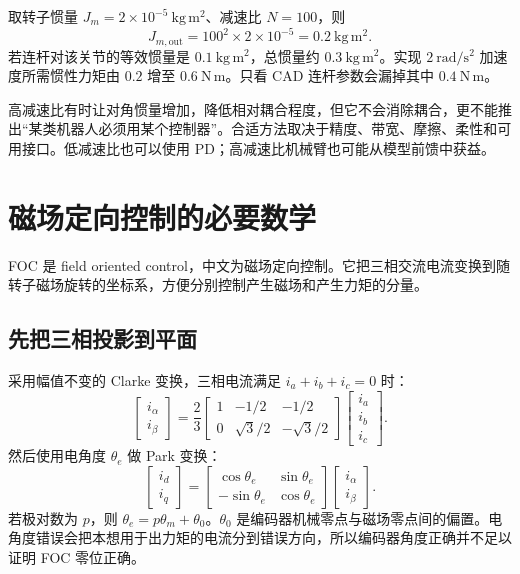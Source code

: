 \begin{examplebox}[算例 7B 一个很小的转子可以有明显的输出端惯量]
取转子惯量 $J_m=2\times10^{-5}\ \mathrm{kg\,m^2}$、减速比 $N=100$，则
\[
 J_{m,\mathrm{out}}=100^2\times2\times10^{-5}=0.2\ \mathrm{kg\,m^2}.
\]
若连杆对该关节的等效惯量是 $0.1\ \mathrm{kg\,m^2}$，总惯量约 $0.3\ \mathrm{kg\,m^2}$。实现 $2\ \mathrm{rad/s^2}$ 加速度所需惯性力矩由 $0.2$ 增至 $0.6\ \mathrm{N\,m}$。只看 CAD 连杆参数会漏掉其中 $0.4\ \mathrm{N\,m}$。
\end{examplebox}

高减速比有时让对角惯量增加，降低相对耦合程度，但它不会消除耦合，更不能推出“某类机器人必须用某个控制器”。合适方法取决于精度、带宽、摩擦、柔性和可用接口。低减速比也可以使用 PD；高减速比机械臂也可能从模型前馈中获益。

\section{磁场定向控制的必要数学}
FOC 是 field oriented control，中文为磁场定向控制。它把三相交流电流变换到随转子磁场旋转的坐标系，方便分别控制产生磁场和产生力矩的分量。

\subsection{先把三相投影到平面}
采用幅值不变的 Clarke 变换，三相电流满足 $i_a+i_b+i_c=0$ 时：
\begin{equation}
 \begin{bmatrix}i_\alpha\\i_\beta\end{bmatrix}
 =\frac23\begin{bmatrix}1&-1/2&-1/2\\0&\sqrt3/2&-\sqrt3/2\end{bmatrix}
 \begin{bmatrix}i_a\\i_b\\i_c\end{bmatrix}.
\end{equation}
然后使用电角度 $\theta_e$ 做 Park 变换：
\begin{equation}
 \begin{bmatrix}i_d\\i_q\end{bmatrix}
 =\begin{bmatrix}\cos\theta_e&\sin\theta_e\\-\sin\theta_e&\cos\theta_e\end{bmatrix}
 \begin{bmatrix}i_\alpha\\i_\beta\end{bmatrix}.
\end{equation}
若极对数为 $p$，则 $\theta_e=p\theta_m+\theta_0$。$\theta_0$ 是编码器机械零点与磁场零点间的偏置。电角度错误会把本想用于出力矩的电流分到错误方向，所以编码器角度正确并不足以证明 FOC 零位正确。

